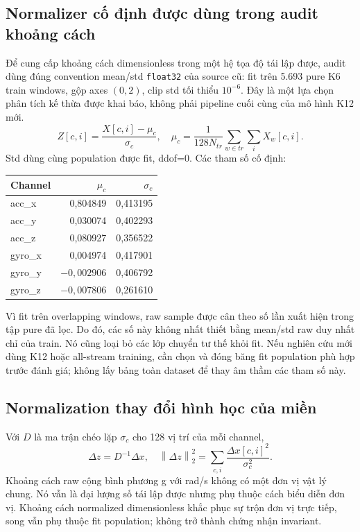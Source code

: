 \documentclass[11pt,a4paper]{article}
\newcommand{\norm}[1]{\left\lVert#1\right\rVert}
\newcommand{\code}[1]{{\small\ttfamily\nolinkurl{#1}}}
\theoremstyle{definition}
\begin{document}
\subsection{Normalizer cố định được dùng trong audit khoảng cách}
Để cung cấp khoảng cách dimensionless trong một hệ tọa độ tái lập được,
audit dùng đúng convention mean/std \code{float32} của source cũ: fit trên
5.693 pure K6 train windows, gộp axes $(0,2)$, clip std tối thiểu $10^{-6}$.
Đây là một lựa chọn phân tích kế thừa được khai báo, không phải pipeline
cuối cùng của mô hình K12 mới.
\begin{equation}
Z[c,i]=\frac{X[c,i]-\mu_c}{\sigma_c},\quad
\mu_c=\frac{1}{128N_{tr}}\sum_{w\in tr}\sum_i X_w[c,i].
\end{equation}
Std dùng cùng population được fit, ddof=0. Các tham số cố định:
\begin{center}\begin{tabular}{@{}lrr@{}}\toprule
Channel & $\mu_c$ & $\sigma_c$\\\midrule
acc\_x & 0,804849 & 0,413195\\
acc\_y & 0,030074 & 0,402293\\
acc\_z & 0,080927 & 0,356522\\
gyro\_x & 0,004974 & 0,417901\\
gyro\_y & $-0,002906$ & 0,406792\\
gyro\_z & $-0,007806$ & 0,261610\\\bottomrule
\end{tabular}\end{center}

Vì fit trên overlapping windows, raw sample được cân theo số lần xuất hiện
trong tập pure đã lọc. Do đó, các số này không nhất thiết bằng mean/std
raw duy nhất chỉ của train. Nó cũng loại bỏ các lớp chuyển tư thế khỏi fit.
Nếu nghiên cứu mới dùng K12 hoặc all-stream training, cần chọn và đóng băng
fit population phù hợp trước đánh giá; không lấy bảng toàn dataset để thay
âm thầm các tham số này.

\subsection{Normalization thay đổi hình học của miền}
Với $D$ là ma trận chéo lặp $\sigma_c$ cho 128 vị trí của mỗi channel,
\begin{equation}
\Delta z=D^{-1}\Delta x,\quad
\norm{\Delta z}_2^2=\sum_{c,i}\frac{\Delta x[c,i]^2}{\sigma_c^2}.
\end{equation}
Khoảng cách raw cộng bình phương g với rad/s không có một đơn vị vật lý
chung. Nó vẫn là đại lượng số tái lập được nhưng phụ thuộc cách biểu diễn
đơn vị. Khoảng cách normalized dimensionless khắc phục sự trộn đơn vị trực
tiếp, song vẫn phụ thuộc fit population; không trở thành chứng nhận invariant.
\end{document}
